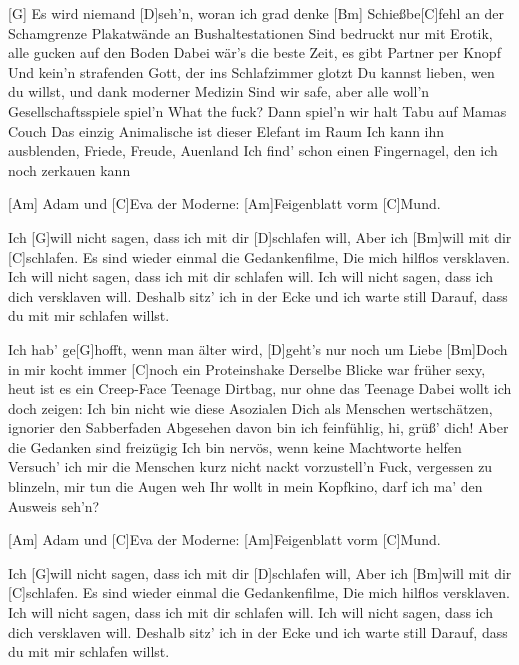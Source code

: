 

\begin{guitar}
	[G] Es wird niemand [D]seh'n, woran ich grad denke
	[Bm] Schießbe[C]fehl an der Schamgrenze
	Plakatwände an Bushaltestationen
	Sind bedruckt nur mit Erotik, alle gucken auf den Boden
	Dabei wär's die beste Zeit, es gibt Partner per Knopf
	Und kein'n strafenden Gott, der ins Schlafzimmer glotzt
	Du kannst lieben, wen du willst, und dank moderner Medizin
	Sind wir safe, aber alle woll'n Gesellschaftsspiele spiel'n
	What the fuck? Dann spiel'n wir halt Tabu auf Mamas Couch
	Das einzig Animalische ist dieser Elefant im Raum
	Ich kann ihn ausblenden, Friede, Freude, Auenland
	Ich find' schon einen Fingernagel, den ich noch zerkauen kann
	
	[Am] Adam und [C]Eva der Moderne:
	[Am]Feigenblatt vorm [C]Mund.
	
	\begin{highlightbar}
		Ich [G]will nicht sagen, dass ich mit dir [D]schlafen will,
		Aber ich [Bm]will mit dir [C]schlafen.
		Es sind wieder einmal die Gedankenfilme,
		Die mich hilflos versklaven.
		Ich will nicht sagen, dass ich mit dir schlafen will.
		Ich will nicht sagen, dass ich dich versklaven will.
		Deshalb sitz' ich in der Ecke und ich warte still
		Darauf, dass du mit mir schlafen willst.
	\end{highlightbar}
	\pagebreak
	\songsection{Strophe 2}
	Ich hab' ge[G]hofft, wenn man älter wird, [D]geht's nur noch um Liebe
	[Bm]Doch in mir kocht immer [C]noch ein Proteinshake
	Derselbe Blicke war früher sexy, heut ist es ein Creep-Face
	Teenage Dirtbag, nur ohne das Teenage
	Dabei wollt ich doch zeigen: Ich bin nicht wie diese Asozialen
	Dich als Menschen wertschätzen, ignorier den Sabberfaden
	Abgesehen davon bin ich feinfühlig, hi, grüß' dich!
	Aber die Gedanken sind freizügig
	Ich bin nervös, wenn keine Machtworte helfen
	Versuch' ich mir die Menschen kurz nicht nackt vorzustell'n
	Fuck, vergessen zu blinzeln, mir tun die Augen weh
	Ihr wollt in mein Kopfkino, darf ich ma' den Ausweis seh'n?
	
	\songsection{Vorrefrain}
	[Am] Adam und [C]Eva der Moderne:
	[Am]Feigenblatt vorm [C]Mund.
	
	\begin{highlightbar}
		\songsection{Refrain}
		Ich [G]will nicht sagen, dass ich mit dir [D]schlafen will,
		Aber ich [Bm]will mit dir [C]schlafen.
		Es sind wieder einmal die Gedankenfilme,
		Die mich hilflos versklaven.
		Ich will nicht sagen, dass ich mit dir schlafen will.
		Ich will nicht sagen, dass ich dich versklaven will.
		Deshalb sitz' ich in der Ecke und ich warte still
		Darauf, dass du mit mir schlafen willst.
	\end{highlightbar}
	

\end{guitar}
